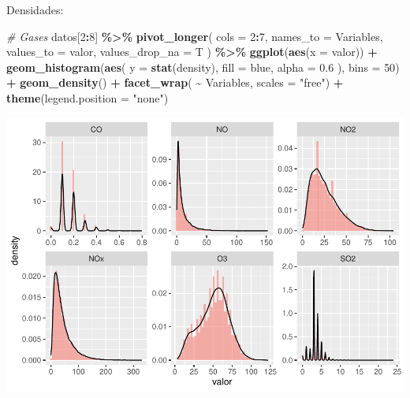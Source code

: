 \documentclass[notspecified,article,submit,moreauthors,pdftex]{Definitions/mdpi}
\newenvironment{Shaded}{\begin{snugshade}}{\end{snugshade}}
\newcommand{\AttributeTok}[1]{\textcolor[rgb]{0.13,0.29,0.53}{#1}}
\newcommand{\CommentTok}[1]{\textcolor[rgb]{0.56,0.35,0.01}{\textit{#1}}}
\newcommand{\DecValTok}[1]{\textcolor[rgb]{0.00,0.00,0.81}{#1}}
\newcommand{\FloatTok}[1]{\textcolor[rgb]{0.00,0.00,0.81}{#1}}
\newcommand{\FunctionTok}[1]{\textcolor[rgb]{0.13,0.29,0.53}{\textbf{#1}}}
\newcommand{\NormalTok}[1]{#1}
\newcommand{\SpecialCharTok}[1]{\textcolor[rgb]{0.81,0.36,0.00}{\textbf{#1}}}
\newcommand{\StringTok}[1]{\textcolor[rgb]{0.31,0.60,0.02}{#1}}
\begin{document}
Densidades:

\begin{Shaded}
\begin{Highlighting}[]
\CommentTok{\# Gases}
\NormalTok{datos[}\DecValTok{2}\SpecialCharTok{:}\DecValTok{8}\NormalTok{] }\SpecialCharTok{\%\textgreater{}\%}
  \FunctionTok{pivot\_longer}\NormalTok{(}
    \AttributeTok{cols =} \DecValTok{2}\SpecialCharTok{:}\DecValTok{7}\NormalTok{,}
    \AttributeTok{names\_to =} \StringTok{\textquotesingle{}Variables\textquotesingle{}}\NormalTok{,}
    \AttributeTok{values\_to =} \StringTok{\textquotesingle{}valor\textquotesingle{}}\NormalTok{,}
    \AttributeTok{values\_drop\_na =}\NormalTok{ T}
\NormalTok{  ) }\SpecialCharTok{\%\textgreater{}\%}
  \FunctionTok{ggplot}\NormalTok{(}\FunctionTok{aes}\NormalTok{(}\AttributeTok{x =}\NormalTok{ valor)) }\SpecialCharTok{+}
  \FunctionTok{geom\_histogram}\NormalTok{(}\FunctionTok{aes}\NormalTok{(}
    \AttributeTok{y =} \FunctionTok{stat}\NormalTok{(density),}
    \AttributeTok{fill =} \StringTok{\textquotesingle{}blue\textquotesingle{}}\NormalTok{,}
    \AttributeTok{alpha =} \FloatTok{0.6}
\NormalTok{  ), }\AttributeTok{bins =} \DecValTok{50}\NormalTok{) }\SpecialCharTok{+}
  \FunctionTok{geom\_density}\NormalTok{() }\SpecialCharTok{+}
  \FunctionTok{facet\_wrap}\NormalTok{( }\SpecialCharTok{\textasciitilde{}}\NormalTok{ Variables, }\AttributeTok{scales =} \StringTok{"free"}\NormalTok{) }\SpecialCharTok{+}
  \FunctionTok{theme}\NormalTok{(}\AttributeTok{legend.position =} \StringTok{"none"}\NormalTok{)}
\end{Highlighting}
\end{Shaded}

\includegraphics{Memoria_files/figure-latex/unnamed-chunk-14-1.pdf}
\end{document}
